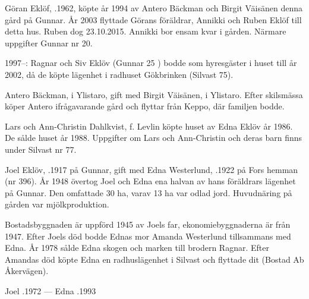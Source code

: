 


Göran Eklöf, .1962, köpte år 1994 av Antero Bäckman  och Birgit Väisänen denna gård på Gunnar. År 2003 flyttade Görans föräldrar, Annikki och Ruben Eklöf till detta hus. Ruben dog 23.10.2015. Annikki bor ensam kvar i gården. Närmare uppgifter Gunnar nr 20.

1997--: Ragnar och Siv Eklöv (Gunnar 25 ) bodde som hyresgäster i huset till år 2002, då de köpte lägenhet i radhuset Gökbrinken (Silvast 75).


Antero Bäckman,  i Ylistaro, gift med Birgit Väisänen,  i Ylistaro. Efter skilsmässa köper Antero ifrågavarande gård och flyttar från Keppo, där familjen bodde.
\begin{jhchildren}
  \item {}
  \item {}
\end{jhchildren}


Lars och Ann-Christin Dahlkvist, f. Levlin  köpte huset av Edna Eklöv år 1986. De sålde huset år 1988. Uppgifter om Lars och Ann-Christin och deras barn finns under Silvast nr 77.


Joel Eklöv, .1917 på Gunnar, gift med Edna Westerlund, .1922 på Fors hemman (nr 396). År 1948 övertog Joel och Edna ena halvan av hans föräldrars lägenhet på Gunnar. Den omfattade 30 ha, varav 13 ha var odlad jord. Huvudnäring på gården var mjölkproduktion.

Bostadsbyggnaden är uppförd 1945 av Joels far, ekonomiebyggnaderna är från 1947. Efter Joels död bodde Ednas mor Amanda Westerlund tillsammans med Edna. År 1978 sålde Edna skogen och marken till brodern Ragnar. Efter Amandas död köpte Edna en radhuslägenhet i Silvast och flyttade dit (Bostad Ab Åkervägen).

Joel .1972  ---  Edna .1993





